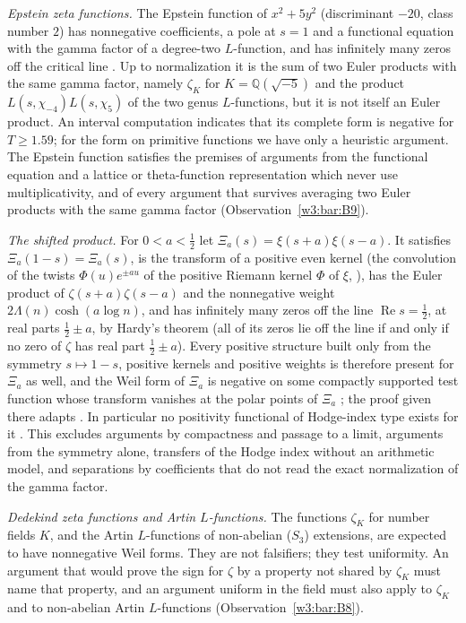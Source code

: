 \documentclass[11pt]{amsart}
\theoremstyle{definition}
\theoremstyle{remark}
\numberwithin{equation}{section}
\newcommand{\Q}{\mathbb{Q}}
\DeclareMathOperator{\Rel}{Re}
\begin{document}
\emph{Epstein zeta functions.} The Epstein function of $x^2+5y^2$ (discriminant $-20$, class number $2$)
has nonnegative coefficients, a pole at $s=1$ and a functional equation with the gamma factor of a degree-two
$L$-function, and has infinitely many zeros off the critical line \cite{DavenportHeilbronn1936}. Up to
normalization it is the sum of two Euler products with the same gamma factor, namely $\zeta_K$ for
$K=\Q(\sqrt{-5})$ and the product $L(s,\chi_{-4})L(s,\chi_5)$ of the two genus $L$-functions, but it is not
itself an Euler product. An interval computation indicates that its complete form is negative for $T\ge1.59$; for
the form on primitive functions we have only a heuristic argument. The Epstein function satisfies the premises of
arguments from the functional equation and a lattice or theta-function representation which never use
multiplicativity, and of every argument that survives averaging two Euler products with the same gamma factor
(Observation~\ref{w3:bar:B9}).

\emph{The shifted product.} For $0<a<\frac12$ let $\Xi_a(s)=\xi(s+a)\xi(s-a)$. It satisfies
$\Xi_a(1-s)=\Xi_a(s)$, is the transform of a positive even kernel (the convolution of the twists
$\Phi(u)e^{\pm au}$ of the positive Riemann kernel $\Phi$ of $\xi$, \cite[\S10.1]{Titchmarsh1986}), has the Euler
product of $\zeta(s+a)\zeta(s-a)$ and the nonnegative weight $2\Lambda(n)\cosh(a\log n)$, and has infinitely many
zeros off the line $\Rel s=\frac12$, at real parts $\frac12\pm a$, by Hardy's theorem (all of its zeros lie off the
line if and only if no zero of $\zeta$ has real part $\frac12\pm a$). Every positive structure built only from the
symmetry $s\mapsto1-s$, positive kernels and positive weights is therefore present for $\Xi_a$ as well, and the Weil
form of $\Xi_a$ is negative on some compactly supported test function whose transform vanishes at the polar points
of $\Xi_a$ \cite[Proposition~9.3]{P47}; the proof given there adapts \cite[Theorem~6.2]{P45}. In particular no
positivity functional of Hodge-index type exists for it \cite[Theorem~9.4]{P47}. This excludes arguments by
compactness and passage to a limit, arguments from the symmetry alone, transfers of the Hodge index without an
arithmetic model, and separations by coefficients that do not read the exact normalization of the gamma factor.

\emph{Dedekind zeta functions and Artin $L$-functions.} The functions $\zeta_K$ for number fields $K$, and the Artin
$L$-functions of non-abelian ($S_3$) extensions, are expected to have nonnegative Weil forms. They are not
falsifiers; they test uniformity. An argument that would prove the sign for $\zeta$ by a property not shared by
$\zeta_K$ must name that property, and an argument uniform in the field must also apply to $\zeta_K$ and to
non-abelian Artin $L$-functions (Observation~\ref{w3:bar:B8}).
\end{document}

